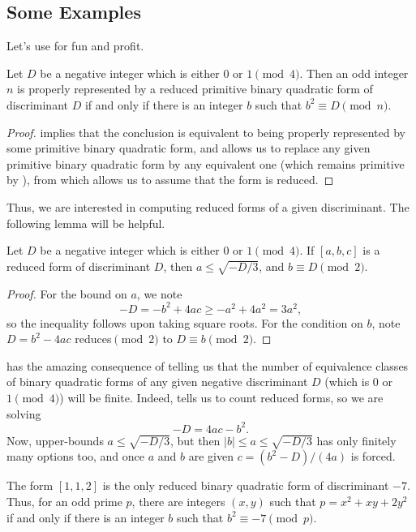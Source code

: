 \documentclass[../notes.tex]{subfiles}
\begin{document}
\subsection{Some Examples} \label{subsec:compute-primes-of-form}
Let's use  for fun and profit.
\begin{lemma} \label{lem:of-the-form-reduced}
	Let $D$ be a negative integer which is either $0$ or $1\pmod4$. Then an odd integer $n$ is properly represented by a reduced primitive binary quadratic form of discriminant $D$ if and only if there is an integer $b$ such that $b^2\equiv D\pmod n$.
\end{lemma}
\begin{proof}
	 implies that the conclusion is equivalent to being properly represented by some primitive binary quadratic form, and  allows us to replace any given primitive binary quad\-ratic form by any equivalent one (which remains primitive by ), from which  allows us to assume that the form is reduced.
\end{proof}
Thus, we are interested in computing reduced forms of a given discriminant. The following lemma will be helpful.
\begin{lemma} \label{lem:bounds-on-reduced-form}
	Let $D$ be a negative integer which is either $0$ or $1\pmod4$. If $[a,b,c]$ is a reduced form of discriminant $D$, then $a\le\sqrt{-D/3}$, and $b\equiv D\pmod2$.
\end{lemma}
\begin{proof}
	For the bound on $a$, we note
	\[-D=-b^2+4ac\ge-a^2+4a^2=3a^2,\]
	so the inequality follows upon taking square roots. For the condition on $b$, note $D=b^2-4ac$ reduces$\pmod2$ to $D\equiv b\pmod2$.
\end{proof}
\begin{remark}
	 has the amazing consequence of telling us that the number of equivalence classes of binary quadratic forms of any given negative discriminant $D$ (which is $0$ or $1\pmod4$) will be finite. Indeed,  tells us to count reduced forms, so we are solving
	\[-D=4ac-b^2.\]
	Now,  upper-bounds $a\le\sqrt{-D/3}$, but then $\left|b\right|\le a\le\sqrt{-D/3}$ has only finitely many options too, and once $a$ and $b$ are given $c=(b^2-D)/(4a)$ is forced.
\end{remark}
\begin{example} \label{ex:primes-of-the-form-7}
	The form $[1,1,2]$ is the only reduced binary quadratic form of discriminant $-7$. Thus, for an odd prime $p$, there are integers $(x,y)$ such that $p=x^2+xy+2y^2$ if and only if there is an integer $b$ such that $b^2\equiv-7\pmod p$.
\end{example}
\end{document}
